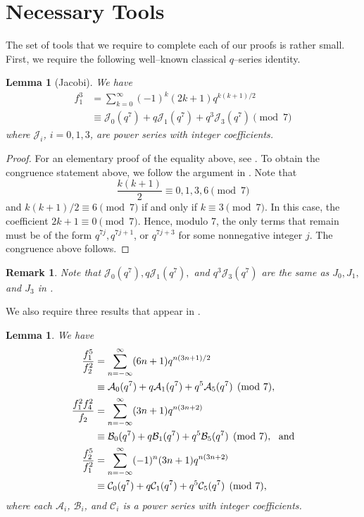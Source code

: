 \documentclass[10pt, reqno]{amsart}
\theoremstyle{theorem}
\newtheorem{lemma}[theorem]{Lemma}
\newtheorem{remark}[theorem]{Remark}
\theoremstyle{definition}
\theoremstyle{example}
\begin{document}
\section{Necessary Tools}
\label{sec:tools}
The set of tools that we require to complete each of our proofs is rather small.  First, we require the following well--known classical $q$--series identity.  
\begin{lemma}[Jacobi]
\label{lem:JacobiCube}
We have 
\begin{align*}
f_1^3 
&= \sum_{k=0}^\infty (-1)^k(2k+1)q^{k(k+1)/2} \\
&\equiv \mathcal{J}_0(q^7) + q\mathcal{J}_1(q^7) + q^3\mathcal{J}_3(q^7) \pmod{7}
\end{align*}
where $\mathcal{J}_i$, $i=0,1,3$, are power series with integer coefficients.  
\end{lemma}
\begin{proof}
For an elementary proof of the equality above, see \cite[(1.7.1)]{Hir}.   To obtain the congruence statement above, we follow the argument in \cite[Section 3.4]{Hir}.  Note that 
$$
\frac{k(k+1)}{2} \equiv 0,1,3,6 \pmod{7}
$$ and $k(k+1)/2 \equiv 6 \pmod{7}$  if and only if $k\equiv 3 \pmod{7}$.  In this case, 
the coefficient $2k+1 \equiv 0 \pmod{7}.$  Hence, modulo 7, the only terms that remain must be of the form $q^{7j}, q^{7j+1}$, or $q^{7j+3}$ for some nonnegative integer $j$.  The congruence above follows.  
\end{proof}
\begin{remark}
Note that $\mathcal{J}_0(q^7),  q\mathcal{J}_1(q^7),$ and $q^3\mathcal{J}_3(q^7)$ are the same as $J_0, J_1,$ and $J_3$ in \cite[(3.4.1)]{Hir}.
\end{remark}
We also require three results that appear in \cite[Chapter 10]{Hir}.  
\begin{lemma}
\label{lem:Hir10_identities}
We have 
\begin{align}
\frac{f_1^5}{f_2^2} 
&= \sum_{n=-\infty}^\infty (6n+1)q^{n(3n+1)/2} \notag \\
&\equiv \mathcal{A}_0(q^7) + q\mathcal{A}_1(q^7)+q^5\mathcal{A}_5(q^7) \pmod{7}, \label{Hir10_eqn1}  \\
\frac{f_1^2f_4^2}{f_2} &= \sum_{n=-\infty}^\infty (3n+1)q^{n(3n+2)} \notag \\
&\equiv \mathcal{B}_0(q^7) + q\mathcal{B}_1(q^7)+q^5\mathcal{B}_5(q^7) \pmod{7}, \text{\ \ and} \label{Hir10_eqn2} \\
\frac{f_2^5}{f_1^2} 
&= \sum_{n=-\infty}^\infty (-1)^n(3n+1)q^{n(3n+2)} \notag \\
&\equiv \mathcal{C}_0(q^7) + q\mathcal{C}_1(q^7)+q^5\mathcal{C}_5(q^7) \pmod{7}, \label{Hir10_eqn3}
\end{align}
where each $\mathcal{A}_i$, $\mathcal{B}_i$, and $\mathcal{C}_i$ is a power series with integer coefficients.  
\end{lemma}
\end{document}
